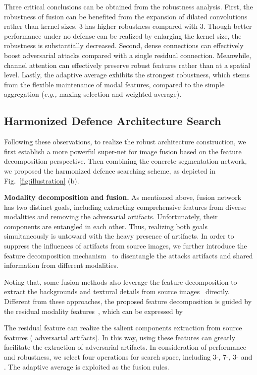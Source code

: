 \documentclass[sigconf]{acmart}
\begin{document}
Three critical conclusions can be obtained from the robustness analysis. First, the robustness of fusion can be benefited from the expansion of dilated convolutions rather than kernel sizes.  3 has higher robustness compared with 3. Though better performance under no defense can be realized by enlarging the kernel size, the robustness is substantially decreased. Second, dense connections can effectively boost adversarial attacks compared with a single residual connection. Meanwhile, channel attention can effectively preserve robust features rather than at a spatial level.  Lastly, the adaptive average exhibits the strongest robustness, which stems from the flexible maintenance of modal features, compared to the simple aggregation (\textit{e.g.,} maxing selection and weighted average). 

\vspace{-1.1em}
\subsection{Harmonized Defence Architecture Search}
Following these observations, to realize the robust architecture construction, we first establish a more powerful super-net for image fusion based on the feature decomposition perspective. Then combining the concrete segmentation network, we proposed the harmonized defence searching scheme, as depicted in Fig.~\ref{fig:illustration} (b).

\textbf{Modality decomposition and fusion.} As mentioned above, fusion network  has two distinct goals, including extracting comprehensive features from diverse modalities and removing the adversarial artifacts. Unfortunately, their components are entangled in each other. Thus,  realizing both goals simultaneously is untoward with the heavy presence of artifacts.
In order to suppress the influences of artifacts from source images, we further introduce the feature decomposition mechanism~\cite{wu2018fast,abs-2211-14461} to disentangle the attacks artifacts and shared information from different modalities. 

Noting that,  some fusion methods also leverage the feature decomposition to extract the backgrounds and textural details from  source images~\cite{liu2021investigating,zhao2021efficient,liu2021searching} directly. Different from these approaches, the proposed feature decomposition is guided by the residual modality features~\cite{li2018robust}, which can be 
expressed by 

The residual feature  can realize the salient components extraction from source features ( adversarial artifacts). 
In this way, using these features can greatly facilitate the extraction of adversarial artifacts.
In consideration of  performance and robustness, we select four operations for search space, including 3-, 7-, 3- and . The adaptive average is exploited as the fusion rules. 
\end{document}
